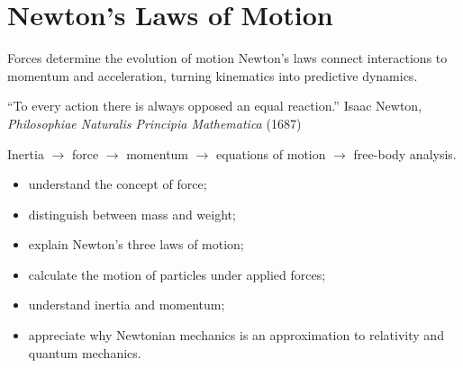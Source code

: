 \chapter{Newton's Laws of Motion}
\chapteropeningart
{Forces determine the evolution of motion}
{Newton's laws connect interactions to momentum and acceleration, turning
kinematics into predictive dynamics.}

\chapterquote
{``To every action there is always opposed an equal reaction.''}
{Isaac Newton, \emph{Philosophiae Naturalis Principia Mathematica} (1687)}

\begin{roadmapbox}
Inertia $\longrightarrow$ force $\longrightarrow$ momentum
$\longrightarrow$ equations of motion $\longrightarrow$ free-body analysis.
\end{roadmapbox}


\learningobjectives

\begin{itemize}
	\item understand the concept of force;
	\item distinguish between mass and weight;
	\item explain Newton's three laws of motion;
	\item calculate the motion of particles under applied forces;
	\item understand inertia and momentum;
	\item appreciate why Newtonian mechanics is an approximation to relativity
	and quantum mechanics.
\end{itemize}

















